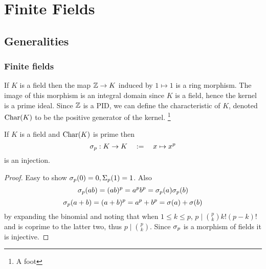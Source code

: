 \chapter{Finite Fields}
\section{Generalities}
\subsection{Finite fields}
\begin{dfn}
    If $K$ is a field then the map $\mathbb{Z} \to K$ induced by $1 \mapsto 1$
    is a ring morphism.
    The image of this morphism is an integral domain since $K$ is a field,
    hence the kernel is a prime ideal. 
    Since $\mathbb{Z}$ is a PID, 
    we can define the characteristic of $K$, denoted
    $\mathrm{Char}(K)$ to be the positive generator of the kernel.
    \footnote{A foot}
\end{dfn}

\begin{prop}
    If $K$ is a field and $\mathrm{Char}(K)$ is prime then 
    \[\sigma_p : K \to K \quad := \quad x \mapsto x^p\]
    is an injection.
\end{prop}
\begin{proof}
    Easy to show $\sigma_p(0) = 0, \Sigma_p (1) = 1$. 
    Also
    \[\sigma_p (ab) = (ab)^p = a^p b^p = \sigma_p(a) \sigma_p(b)\]
    \[\sigma_p (a +b) = (a + b)^p = a^p + b^p = \sigma(a) + \sigma(b)\]
    by expanding the binomial and noting that when $1 \le k \le p$, 
    $ p \mid \binom{p}{k} k! (p-k)!$ and is coprime to the latter two,
    thus $p \mid \binom{p}{k}$.
    Since $\sigma_p$ is a morphism of fields it is injective.
\end{proof}

